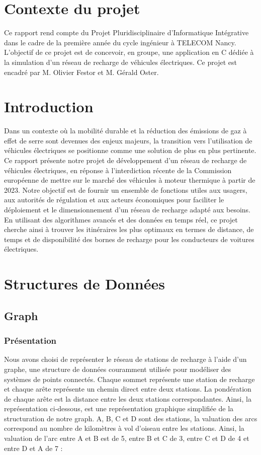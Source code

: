 \documentclass[french,a4paper]{article}
\begin{document}
\section{Contexte du projet}
Ce rapport rend compte du Projet Pluridisciplinaire d’Informatique Intégrative dans le cadre de la première année du cycle ingénieur à TELECOM Nancy.
L’objectif de ce projet est de concevoir, en groupe,  une application en C dédiée à la simulation d’un réseau de recharge de véhicules électriques. 
Ce projet est encadré par M. Olivier Festor et M. Gérald Oster.
\section{Introduction}
Dans un contexte où la mobilité durable et la réduction des émissions de gaz à effet 
de serre sont devenues des enjeux majeurs, la transition vers l'utilisation de véhicules électriques se positionne comme une solution 
de plus en plus pertinente. 
Ce rapport présente notre projet de développement d'un réseau de recharge de véhicules électriques, en réponse à l'interdiction récente de la 
Commission européenne de mettre sur le marché des véhicules à moteur thermique à partir de 2023. Notre objectif est de fournir un ensemble de
 fonctions utiles aux usagers, aux autorités de régulation et aux acteurs économiques pour faciliter le déploiement et le dimensionnement d'un 
 réseau de recharge adapté aux besoins.
En utilisant des algorithmes avancés et des données en temps réel, ce projet cherche ainsi à trouver les itinéraires les plus optimaux en termes de distance, de temps et de disponibilité des 
bornes de recharge pour les conducteurs de voitures électriques. 

\section{Structures de Données}
\subsection{Graph}
\subsubsection{Présentation}
Nous avons choisi de représenter le réseau de stations de recharge à l'aide d'un graphe, une structure de données couramment utilisée pour modéliser des systèmes de points connectés. Chaque sommet représente une station de recharge et chaque arête représente un chemin direct entre deux stations. La pondération de chaque arête est la distance entre les deux stations correspondantes.
Ainsi, la représentation ci-dessous, est une représentation graphique simplifiée de la structuration de notre graph. A, B, C et D sont des stations, la valuation des arcs correspond au nombre de kilomètres à vol d'oiseau entre les stations. Ainsi, la valuation de l'arc entre A et B est de 5, entre B et C de 3, entre C et D de 4 et entre D et A de 7 :
\end{document}
